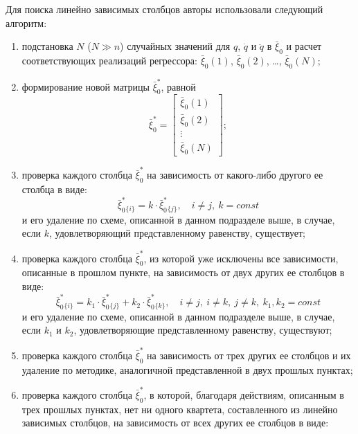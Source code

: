 Для поиска линейно зависимых столбцов авторы использовали следующий алгоритм:
\begin{enumerate}
    \item подстановка $N$ ($N \gg n$) случайных значений для $q$, $\dot{q}$ и $\ddot{q}$ в $\bar{\xi}_0$ и расчет соответствующих реализаций регрессора: $\bar{\xi}_0(1)$, $\bar{\xi}_0(2)$, \ldots, $\bar{\xi}_0(N)$;
    \item формирование новой матрицы $\bar\xi_0^*$, равной
    \begin{equation}
        \bar\xi_0^* =
        \begin{bmatrix}
            \bar{\xi}_0(1) \\ \bar{\xi}_0(2) \\ \vdots \\ \bar{\xi}_0(N)
        \end{bmatrix}\!\!;
    \end{equation}
    \item \label{enum_delete_1}проверка каждого столбца $\bar\xi_0^*$ на зависимость от какого-либо другого ее столбца в виде:
    \begin{equation}
        \bar\xi_0^*{}_{\{i\}} = k \cdot \bar\xi_0^*{}_{\{j\}}, \quad i \ne j,\ k = const
    \end{equation}
    и его удаление по схеме, описанной в данном подразделе выше, в случае, если $k$, удовлетворяющий представленному равенству, существует;
    \item проверка каждого столбца $\bar\xi_0^*$, из которой уже исключены все зависимости, описанные в прошлом пункте, на зависимость от двух других ее столбцов в виде:
    \begin{equation}
        \bar\xi_0^*{}_{\{i\}} = k_1 \cdot \bar\xi_0^*{}_{\{j\}} + k_2 \cdot \bar\xi_0^*{}_{\{k\}}, \quad i \ne j,\ i \ne k,\ j \ne k,\ k_1, k_2 = const
    \end{equation}
    и его удаление по схеме, описанной в данном подразделе выше, в случае, если $k_1$ и $k_2$, удовлетворяющие представленному равенству, существуют;
    \item проверка каждого столбца $\bar\xi_0^*$ на зависимость от трех других ее столбцов и их удаление по методике, аналогичной представленной в двух прошлых пунктах;
    \item \label{enum_delete_many}проверка каждого столбца $\bar\xi_0^*$, в которой, благодаря действиям, описанным в трех прошлых пунктах, нет ни одного квартета, составленного из линейно зависимых столбцов, на зависимость от всех других ее столбцов в виде:

\end{enumerate}
